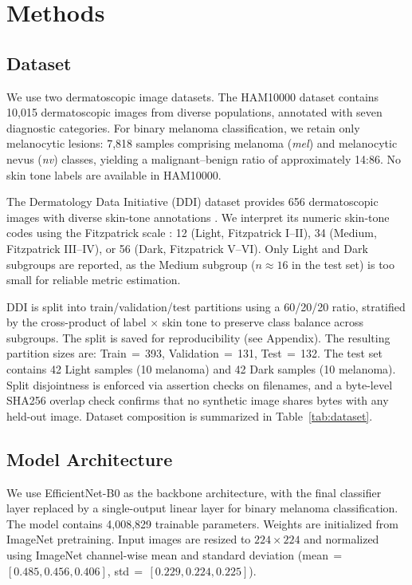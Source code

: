 \section{Methods}

\subsection{Dataset}

We use two dermatoscopic image datasets. The HAM10000 dataset \cite{Tschandl2018} contains 10,015 dermatoscopic images from diverse populations, annotated with seven diagnostic categories. For binary melanoma classification, we retain only melanocytic lesions: 7,818 samples comprising melanoma (\emph{mel}) and melanocytic nevus (\emph{nv}) classes, yielding a malignant--benign ratio of approximately 14:86. No skin tone labels are available in HAM10000.

The Dermatology Data Initiative (DDI) dataset provides 656 dermatoscopic images with diverse skin-tone annotations \cite{DDI2021}. We interpret its numeric skin-tone codes using the Fitzpatrick scale \cite{Fitzpatrick1988}: 12 (Light, Fitzpatrick I--II), 34 (Medium, Fitzpatrick III--IV), or 56 (Dark, Fitzpatrick V--VI). Only Light and Dark subgroups are reported, as the Medium subgroup ($n \approx 16$ in the test set) is too small for reliable metric estimation.

DDI is split into train/validation/test partitions using a 60/20/20 ratio, stratified by the cross-product of label $\times$ skin tone to preserve class balance across subgroups. The split is saved for reproducibility (see Appendix). The resulting partition sizes are: Train\,$=$\,393, Validation\,$=$\,131, Test\,$=$\,132. The test set contains 42 Light samples (10 melanoma) and 42 Dark samples (10 melanoma). Split disjointness is enforced via assertion checks on filenames, and a byte-level SHA256 overlap check confirms that no synthetic image shares bytes with any held-out image. Dataset composition is summarized in Table~\ref{tab:dataset}.

\subsection{Model Architecture}

We use EfficientNet-B0 \cite{Tan2019EfficientNet} as the backbone architecture, with the final classifier layer replaced by a single-output linear layer for binary melanoma classification. The model contains 4,008,829 trainable parameters. Weights are initialized from ImageNet pretraining. Input images are resized to $224 \times 224$ and normalized using ImageNet channel-wise mean and standard deviation (mean\,$=$\,$[0.485, 0.456, 0.406]$, std\,$=$\,$[0.229, 0.224, 0.225]$).


